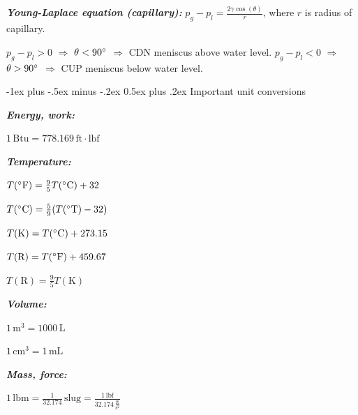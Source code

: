 \documentclass[10pt,landscape,letterpaper]{article}
\makeatletter
\renewcommand{\subsection}{\@startsection{subsection}{2}{0mm}%
                                {-1ex plus -.5ex minus -.2ex}%
                                {0.5ex plus .2ex}%
                                {\normalfont\normalsize\bfseries}}
\newcommand{\fsheetlabel}[1]{\textcolor{FSheetLabelColor}{\textbf{\textit{#1}}}}
\makeatother
\begin{document}
\begin{multicols*}{3}
\begin{minipage}{\columnwidth}
        \fsheetlabel{Young-Laplace equation (capillary):} $p_{g} - p_{l} = \frac{2\gamma\cos{\left(\theta\right)}}{r}$, where $r$ is radius of capillary.
        
        $p_g - p_l > 0$ $\Rightarrow$ $\theta < 90\degree$ $\Rightarrow$ CDN meniscus above water level.
        $p_g - p_l < 0$ $\Rightarrow$ $\theta > 90\degree$ $\Rightarrow$ CUP meniscus below water level.
    \end{minipage}
    \vspace{2ex plus .5ex minus .5ex}
    
    \begin{minipage}{\columnwidth}\raggedright
        \subsection{Important unit conversions}
        
        \fsheetlabel{Energy, work:}
        
        $1\,\text{Btu} = 778.169\,\text{ft}\cdot\text{lbf}$
        
        \fsheetlabel{Temperature:}
        
        $T(\degree\text{F}) = \frac{9}{5} T(\degree\text{C}) + 32$
        
        $T(\degree\text{C}) = \frac{5}{9}(T(\degree\text{T}) - 32)$
        
        $T(\text{K}) = T(\degree\text{C}) + 273.15$
        
        $T(\text{R}) = T(\degree\text{F}) + 459.67$
        
        $T(\text{R}) = \frac{9}{5} T(\text{K})$
        
        \fsheetlabel{Volume:}
        
        $1\,\text{m}^3 = 1000\,\text{L}$
        
        $1\,\text{cm}^3 = 1\,\text{mL}$
        
        \fsheetlabel{Mass, force:}
        
        $1 \,\text{lbm} = \frac{1}{32.174} \,\text{slug} = \frac{1 \,\text{lbf}}{32.174 \,\frac{\text{ft}}{\text{s}^2}}$
    \end{minipage}
    \vspace{2ex plus .5ex minus .5ex}
    
    \begin{minipage}{\columnwidth}\raggedright

\end{minipage}
\end{multicols*}
\end{document}
